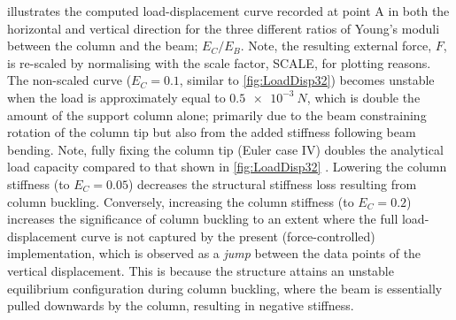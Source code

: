   illustrates the computed load-displacement curve recorded at point A in both the horizontal and vertical direction for the three different ratios of Young's moduli between the column and the beam; $E_{C}/E_{B}$. Note, the resulting external force, $F$, is re-scaled by normalising with the scale factor, SCALE, for plotting reasons. The non-scaled curve ($E_{C}=0.1$, similar to \cref{fig:LoadDisp32}) becomes unstable when the load is approximately equal to $\SI{0.5e-3}{N}$, which is double the amount of the support column alone; primarily due to the beam constraining rotation of the column tip but also from the added stiffness following beam bending. Note, fully fixing the column tip (Euler case IV) doubles the analytical load capacity compared to that shown in \cref{fig:LoadDisp32} \cite{Styrkebog}. Lowering the column stiffness (to $E_C=0.05$) decreases the structural stiffness loss resulting from column buckling. Conversely, increasing the column stiffness (to $E_C=0.2$) increases the significance of column buckling to an extent where the full load-displacement curve is not captured by the present (force-controlled) implementation, which is observed as a \textit{jump} between the data points of the vertical displacement. This is because the structure attains an unstable equilibrium configuration during column buckling, where the beam is essentially pulled downwards by the column, resulting in negative stiffness.


